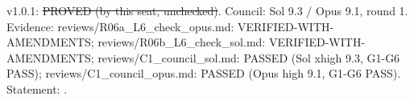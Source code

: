\begin{theorem}\label{reg:W2-LOC2_Thm-Poly}
\end{theorem}
\begin{statusbox}
 v1.0.1: \st{PROVED (by this seat, unchecked)}. Council: Sol 9.3 / Opus 9.1, round 1. Evidence: reviews/R06a\_L6\_check\_opus.md: VERIFIED-WITH-AMENDMENTS; reviews/R06b\_L6\_check\_sol.md: VERIFIED-WITH-AMENDMENTS; reviews/C1\_council\_sol.md: PASSED (Sol xhigh 9.3, G1-G6 PASS); reviews/C1\_council\_opus.md: PASSED (Opus high 9.1, G1-G6 PASS). Statement: .
\end{statusbox}
